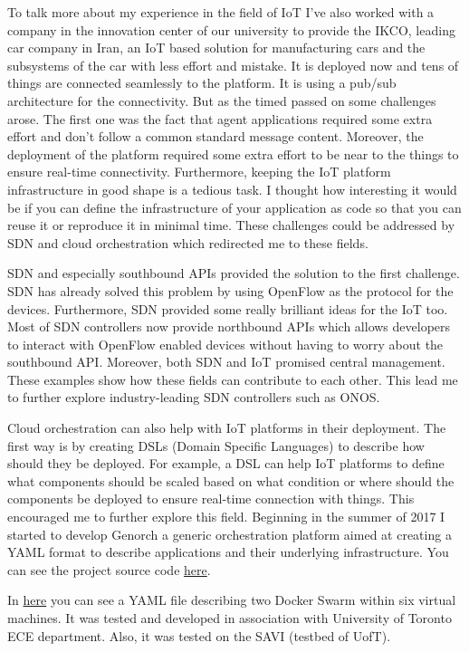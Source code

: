 \documentclass[11pt,a4paper,sans]{moderncv}        %
\begin{document}
To talk more about my experience in the field of IoT I've also worked with a
company in the innovation center of our university to provide the IKCO,
leading car company in Iran, an IoT based solution for manufacturing cars
and the subsystems of the car with less effort and mistake. It is deployed now
and tens of things are connected seamlessly to the platform. It is using
a pub/sub architecture for the connectivity. But as the timed passed on some
challenges arose. The first one was the fact that agent applications required some extra effort
and don't follow a common standard message content. Moreover, the deployment
of the platform required some extra effort to be near to the things to ensure
real-time connectivity. Furthermore, keeping the IoT platform infrastructure
in good shape is a tedious task. I thought how interesting it would be if you
can define the infrastructure of your application as code so that you can reuse
it or reproduce it in minimal time. These challenges could be addressed by SDN and
cloud orchestration which redirected me to these fields.

SDN and especially southbound APIs provided the solution to the first challenge.
SDN has already solved this problem by using OpenFlow as the protocol for
the devices. Furthermore, SDN provided some really brilliant ideas for the
IoT too. Most of SDN controllers now provide northbound APIs which allows
developers to interact with OpenFlow enabled devices without having to worry
about the southbound API. Moreover, both SDN and IoT promised central management.
These examples show how these fields can contribute to each other. This
lead me to further explore industry-leading SDN controllers such as ONOS.

Cloud orchestration can also help with IoT platforms in their deployment.
The first way is by creating DSLs (Domain Specific Languages) to describe
how should they be deployed. For example, a DSL can help IoT platforms
to define what components should be scaled based on what condition or where
should the components be deployed to ensure real-time connection with things.
This encouraged me to further explore this field. Beginning in the summer
of 2017 I started to develop Genorch a generic orchestration platform
aimed at creating a YAML format to describe applications and their underlying
infrastructure. You can see the project source code \href{https://github.com/genorch/orchestration}{here}.

In \href{https://github.com/Genorch/Orchestration/blob/master/examples/clusters.yml}{here}
you can see a YAML file describing two Docker Swarm within six virtual machines.
It was tested and developed in association with University of Toronto ECE
department. Also, it was tested on the SAVI (testbed of UofT).
\end{document}
